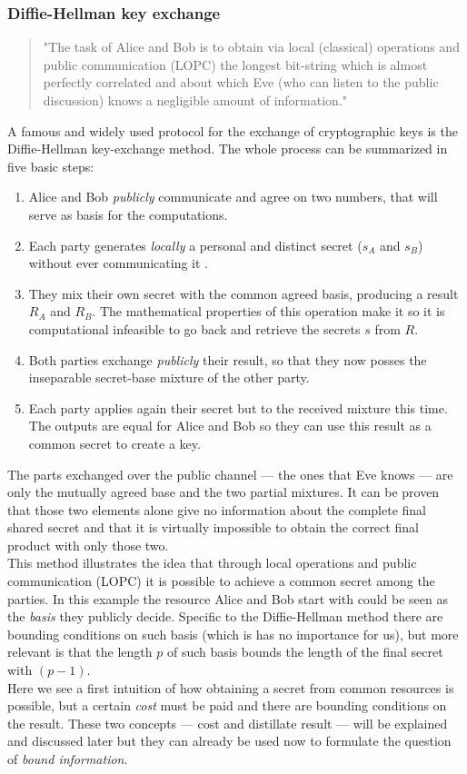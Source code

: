 	\subsubsection*{Diffie-Hellman key exchange}
		\begin{quotation}
			"The task of Alice and Bob is to obtain via local (classical) operations and public communication (LOPC) the longest bit-string which is almost perfectly correlated and about which Eve (who can listen to the public discussion) knows a negligible amount of information."
		\cite{4H07}
	\end{quotation}	
	A famous and widely used protocol for the exchange of cryptographic keys is the Diffie-Hellman key-exchange method.\cite{DH76}
	The whole process can be summarized in five basic steps:
	\begin{enumerate}
		\item Alice and Bob \emph{publicly} communicate and agree on two numbers, that will serve as basis for the computations.
		\item Each party generates \emph{locally} a personal and distinct secret ($s_A$ and $s_B$) without ever communicating it .
		\item They mix their own secret with the common agreed basis, producing a result $R_A$ and $R_B$. The mathematical properties of this operation make it so it is computational infeasible to go back and retrieve the secrets $s$ from $R$.
		\item Both parties exchange \emph{publicly} their result, so that they now posses the inseparable secret-base mixture of the other party.
		\item Each party applies again their secret but to the received mixture this time. The outputs are equal for Alice and Bob so they can use this result as a common secret to create a key.
	\end{enumerate}	 
	The parts exchanged over the public channel --- the ones that Eve knows --- are only the mutually agreed base and the two partial mixtures. 
	It can be proven that those two elements alone give no information about the complete final shared secret and that it is virtually impossible to obtain the correct final product with only those two.\\
	This method illustrates the idea that through local operations and public communication (LOPC) it is possible to achieve a common secret among the parties. 
	In this example the resource Alice and Bob start with could be seen as the \textit{basis} they publicly decide. %
	 Specific to the Diffie-Hellman method there are bounding conditions on such basis (which is has no importance for us), but more relevant is that the length $p$ of such basis bounds the length of the final secret with $(p-1)$. \\
	 Here we see a first intuition of how obtaining a secret from common resources is possible, but a certain \emph{cost} must be paid and there are bounding conditions on the result. 
	 These two concepts --- cost and distillate result --- will be explained and discussed later but they can  already be used now to formulate the question of \emph{bound information}.
	 
